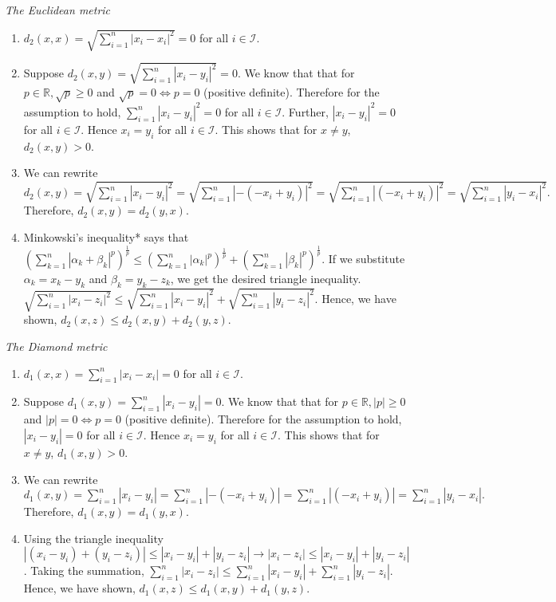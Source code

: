 \begin{frame}
\textit{The Euclidean metric}\hfill\break
\begin{enumerate}
    \item $d_2(x,x) = \sqrt{\sum_{i=1}^{n} |x_i - x_i|^2} = 0$ for all $i\in
    \mathcal{I}.$
    \item Suppose $d_2(x,y) = \sqrt{\sum_{i=1}^{n} |x_i - y_i|^2} = 0$. We know
    that that for $p \in \mathbb{R}, \sqrt{p}\geq0$ and $\sqrt{p} = 0 \iff p =
    0$ (positive definite). Therefore for the assumption to hold,
    $\sum_{i=1}^{n} |x_i - y_i|^2 = 0$ for all $i \in \mathcal{I}$. Further, $
    |x_i - y_i|^2 = 0$ for all $i \in \mathcal{I}$. Hence $x_i = y_i$ for all $i
    \in \mathcal{I}$. This shows that for $x\neq y$, $d_2(x,y)>0$.
    \item We can rewrite $d_2(x,y) = \sqrt{\sum_{i=1}^{n} |x_i - y_i|^2} =
    \sqrt{\sum_{i=1}^{n} |- (- x_i + y_i)|^2} = \sqrt{\sum_{i=1}^{n} |(- x_i +
    y_i)|^2} = \sqrt{\sum_{i=1}^{n} |y_i - x_i|^2}.$ Therefore, $d_2(x,y) =
    d_2(y,x).$
    \item Minkowski's inequality* says that
    $(\sum_{k=1}^{n}|\alpha_k+\beta_k|^p)^\frac{1}{p} \leq
    (\sum_{k=1}^{n}|\alpha_k|^p)^\frac{1}{p} +
    (\sum_{k=1}^{n}|\beta_k|^p)^\frac{1}{p}$. If we substitute $\alpha_k =
    x_k-y_k$ and $\beta_k = y_k - z_k$, we get the desired triangle inequality.
    $ \sqrt{\sum_{i=1}^{n} |x_i - z_i|^2} \leq  \sqrt{\sum_{i=1}^{n} |x_i -
    y_i|^2} +  \sqrt{\sum_{i=1}^{n} |y_i - z_i|^2}$. Hence, we have shown,
    $d_2(x,z) \leq d_2(x,y)+d_2(y,z).$
\end{enumerate}
\end{frame}

\begin{frame}
\textit{The Diamond metric}\hfill\break
\begin{enumerate}
    \item $d_1(x,x) = \sum_{i=1}^{n} |x_i - x_i| = 0$ for all $i\in
    \mathcal{I}.$
    \item Suppose $d_1(x,y) = \sum_{i=1}^{n} |x_i - y_i| = 0$. We know that that
    for $p \in \mathbb{R}, |p|\geq 0$ and $|p| = 0 \iff p = 0$ (positive
    definite). Therefore for the assumption to hold, $|x_i - y_i| = 0$ for all
    $i \in \mathcal{I}$. Hence $x_i = y_i$ for all $i \in \mathcal{I}$. This
    shows that for $x\neq y$, $d_1(x,y)>0$.
    \item We can rewrite $d_1(x,y) = \sum_{i=1}^{n} |x_i - y_i| = \sum_{i=1}^{n}
    |- (- x_i + y_i)| = \sum_{i=1}^{n} |(- x_i + y_i)| = \sum_{i=1}^{n} |y_i -
    x_i |.$ Therefore, $d_1(x,y) = d_1(y,x).$
    \item Using the triangle inequality $|(x_i - y_i) + (y_i - z_i)| \leq |x_i -
    y_i| + |y_i - z_i| \rightarrow |x_i - z_i| \leq |x_i - y_i| + |y_i - z_i|$.
    Taking the summation, $\sum_{i=1}^{n}|x_i - z_i| \leq \sum_{i=1}^{n}|x_i -
    y_i| + \sum_{i=1}^{n}|y_i - z_i|$. Hence, we have shown, $d_1(x,z) \leq
    d_1(x,y)+d_1(y,z).$
\end{enumerate}
\end{frame}

